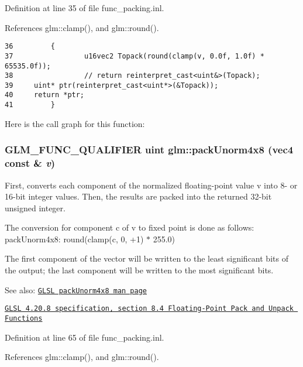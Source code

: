 Definition at line 35 of file func\_\-packing.inl.

References glm::clamp(), and glm::round().

\begin{Code}\begin{verbatim}36         {
37                 u16vec2 Topack(round(clamp(v, 0.0f, 1.0f) * 65535.0f));
38                 // return reinterpret_cast<uint&>(Topack);
39     uint* ptr(reinterpret_cast<uint*>(&Topack));
40     return *ptr;
41         }
\end{verbatim}
\end{Code}




Here is the call graph for this function:\hypertarget{group__core__func__packing_g834ee9a9e73dcb0a7c1fc88143f3edb8}{
\subsubsection[packUnorm4x8]{\setlength{\rightskip}{0pt plus 5cm}GLM\_\-FUNC\_\-QUALIFIER uint glm::packUnorm4x8 (vec4 const \& {\em v})}}
\label{group__core__func__packing_g834ee9a9e73dcb0a7c1fc88143f3edb8}


First, converts each component of the normalized floating-point value v into 8- or 16-bit integer values. Then, the results are packed into the returned 32-bit unsigned integer.

The conversion for component c of v to fixed point is done as follows: packUnorm4x8: round(clamp(c, 0, +1) $\ast$ 255.0)

The first component of the vector will be written to the least significant bits of the output; the last component will be written to the most significant bits.

\begin{Desc}
\item[See also:]\href{http://www.opengl.org/sdk/docs/manglsl/xhtml/packUnorm4x8.xml}{\tt GLSL packUnorm4x8 man page} 

\href{http://www.opengl.org/registry/doc/GLSLangSpec.4.20.8.pdf}{\tt GLSL 4.20.8 specification, section 8.4 Floating-Point Pack and Unpack Functions} \end{Desc}


Definition at line 65 of file func\_\-packing.inl.

References glm::clamp(), and glm::round().

